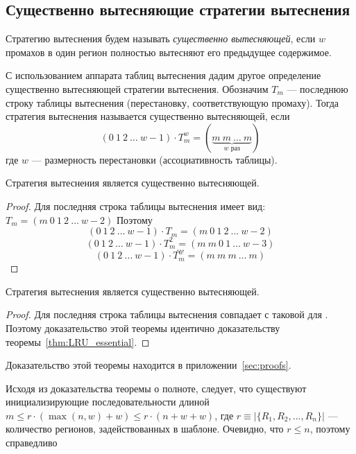 \subsection{Существенно вытесняющие стратегии вытеснения}\label{sec:essentially_displacing}

Стратегию вытеснения будем называть \emph{существенно вытесняющей}, если $w$ промахов в один регион полностью вытесняют его предыдущее содержимое.

С использованием аппарата таблиц вытеснения дадим другое определение существенно вытесняющей стратегии вытеснения. Обозначим $T_m$ --- последнюю строку таблицы вытеснения (перестановку, соответствующую промаху). Тогда стратегия вытеснения называется существенно вытесняющей, если $$(0~1~2~\dots~w{-}1) \cdot T_m^w = (\underbrace{m~m~\dots~m}_{\mbox{$w$~раз}})$$ где $w$ --- размерность перестановки (ассоциативность таблицы).

\begin{theorem}\label{thm:LRU_essential}
  Стратегия вытеснения \LRU является существенно вытесняющей.
\end{theorem}
\begin{proof}
  Для \LRU последняя строка таблицы вытеснения имеет вид: $T_m = (m~0~1~2~\dots~w{-}2)$ Поэтому
  $$(0~1~2~\dots~w{-}1) \cdot T_m = (m~0~1~2~\dots~w{-}2)$$
  $$(0~1~2~\dots~w{-}1) \cdot T_m^2 = (m~m~0~1~\dots~w{-}3)$$
  $$\mbox{...}$$
  $$(0~1~2~\dots~w{-}1) \cdot T_m^w = (m~m~m~\dots~m)$$
\end{proof}

\begin{theorem}
  Стратегия вытеснения \FIFO является существенно вытесняющей.
\end{theorem}
\begin{proof}
  Для \FIFO последняя строка таблицы вытеснения совпадает с таковой для \LRU. Поэтому доказательство этой теоремы идентично доказательству теоремы~\ref{thm:LRU_essential}.
\end{proof}

\begin{theorem}\label{thm:PseudoLRU_essential} \PseudoLRUEssential \end{theorem}

Доказательство этой теоремы находится в приложении~\ref{sec:proofs}.

Исходя из доказательства теоремы о полноте, следует, что существуют инициализирующие последовательности длиной $m \leqslant r \cdot (\max(n,w) + w) \leqslant r \cdot (n + w + w)$, где $r \equiv |\{R_1, R_2, ..., R_n\}|$ --- количество регионов, задействованных в шаблоне. Очевидно, что $r \leqslant n$, поэтому справедливо

